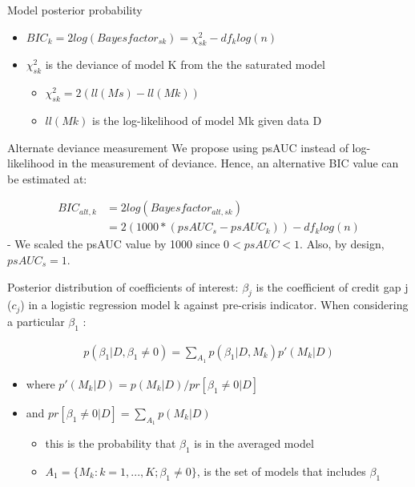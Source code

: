 \documentclass[
  ignorenonframetext,
]{beamer}
\providecommand{\tightlist}{%
  \setlength{\itemsep}{0pt}\setlength{\parskip}{0pt}}
\begin{document}
\begin{frame}{Model posterior probability}
\protect\hypertarget{model-posterior-probability}{}
\begin{itemize}
\tightlist
\item
  \(BIC_k = 2log (Bayesfactor_{sk}) = \chi^2_{sk} - df_klog(n)\)
\item
  \(\chi^2_{sk}\) is the deviance of model K from the the saturated
  model

  \begin{itemize}
  \tightlist
  \item
    \(\chi^2_{sk} = 2(ll(Ms) - ll(Mk))\)
  \item
    \(ll(Mk)\) is the log-likelihood of model Mk given data D
  \end{itemize}
\end{itemize}

\begin{block}{Alternate deviance measurement}
\protect\hypertarget{alternate-deviance-measurement}{}
We propose using psAUC instead of log-likelihood in the measurement of
deviance. Hence, an alternative BIC value can be estimated at:

\begin{align}
BIC_{alt,k} &= 2log (Bayesfactor_{alt,sk}) \\
&= 2(1000*(psAUC_s-psAUC_k)) - df_klog(n)
\end{align} - We scaled the psAUC value by 1000 since \(0<psAUC<1\).
Also, by design, \(psAUC_s=1\).
\end{block}
\end{frame}

\begin{frame}{Posterior distribution of coefficients of interest:}
\protect\hypertarget{posterior-distribution-of-coefficients-of-interest}{}
\(\beta_j\) is the coefficient of credit gap j (\(c_j\)) in a logistic
regression model k against pre-crisis indicator. When considering a
particular \(\beta_1\) :

\begin{align*}
p(\beta_1|D, \beta_1\ne 0) = \sum\nolimits_{A_1} p(\beta_1|D,M_k)p'(M_k|D)
\end{align*}

\begin{itemize}
\tightlist
\item
  where \(p'(M_k|D)=p(M_k|D)/ pr[\beta_1 \ne 0|D]\)
\item
  and \(pr[\beta_1 \ne 0|D] = \sum\limits_{A_1} p(M_k|D)\)

  \begin{itemize}
  \tightlist
  \item
    this is the probability that \(\beta_1\) is in the averaged model
  \item
    \(A_1= \{M_k: k=1,...,K; \beta_1 \ne 0\}\), is the set of models
    that includes \(\beta_1\)
  \end{itemize}
\end{itemize}
\end{frame}
\end{document}

